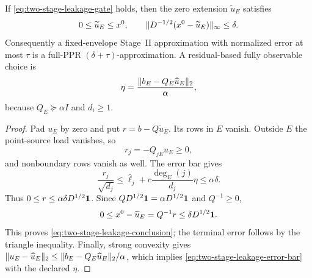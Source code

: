 \begin{proposition}
\label{prop:two-stage-leakage-certificate}
If \cref{eq:two-stage-leakage-gate} holds, then the zero extension
$\widetilde u_E$ satisfies
\begin{equation}
 0\leq\widetilde u_E\leq x^0,
 \qquad
 \lVert D^{-1/2}(x^0-\widetilde u_E)\rVert_\infty\leq\delta.
 \label{eq:two-stage-leakage-conclusion}
\end{equation}
Consequently a fixed-envelope Stage~II approximation with normalized error
at most $\tau$ is a full-PPR $(\delta+\tau)$-approximation.  A residual-based
fully observable choice is
\begin{equation}
 \eta=\frac{\lVert b_E-Q_E\widehat u_E\rVert_2}{\alpha},
 \label{eq:two-stage-leakage-residual-error}
\end{equation}
because $Q_E\succeq\alpha I$ and $d_i\geq1$.
\end{proposition}

\begin{proof}
Pad $u_E$ by zero and put $r=b-Q\widetilde u_E$.  Its rows in $E$ vanish.
Outside $E$ the point-source load vanishes, so
\begin{equation*}
 r_j=-Q_{jE}u_E\geq0,
\end{equation*}
and nonboundary rows vanish as well.  The error bar gives
\begin{equation*}
 \frac{r_j}{\sqrt{d_j}}
 \leq\widehat\ell_j
 +c\frac{\deg_E(j)}{d_j}\eta
 \leq\alpha\delta.
\end{equation*}
Thus $0\leq r\leq\alpha\delta D^{1/2}\mathbf{1}$.  Since
$QD^{1/2}\mathbf{1}=\alpha D^{1/2}\mathbf{1}$ and $Q^{-1}\geq0$,
\begin{equation*}
 0\leq x^0-\widetilde u_E=Q^{-1}r
 \leq\delta D^{1/2}\mathbf{1}.
\end{equation*}
This proves \cref{eq:two-stage-leakage-conclusion}; the terminal error follows
by the triangle inequality.  Finally, strong convexity gives
$\lVert u_E-\widehat u_E\rVert_2\leq
\lVert b_E-Q_E\widehat u_E\rVert_2/\alpha$, which implies
\cref{eq:two-stage-leakage-error-bar} with the declared $\eta$.
\end{proof}

